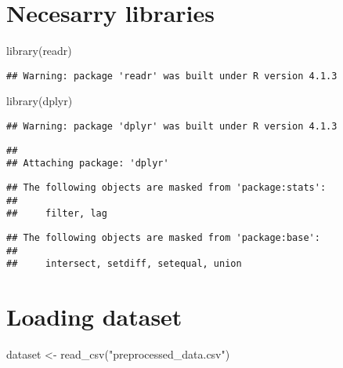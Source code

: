\documentclass[
]{article}
\author{}
\date{\vspace{-2.5em}}
\newenvironment{Shaded}{\begin{snugshade}}{\end{snugshade}}
\newcommand{\FunctionTok}[1]{\textcolor[rgb]{0.00,0.00,0.00}{#1}}
\newcommand{\NormalTok}[1]{#1}
\newcommand{\OtherTok}[1]{\textcolor[rgb]{0.56,0.35,0.01}{#1}}
\newcommand{\StringTok}[1]{\textcolor[rgb]{0.31,0.60,0.02}{#1}}
\begin{document}
\hypertarget{necesarry-libraries}{%
\section{Necesarry libraries}\label{necesarry-libraries}}

\begin{Shaded}
\begin{Highlighting}[]
\FunctionTok{library}\NormalTok{(readr)}
\end{Highlighting}
\end{Shaded}

\begin{verbatim}
## Warning: package 'readr' was built under R version 4.1.3
\end{verbatim}

\begin{Shaded}
\begin{Highlighting}[]
\FunctionTok{library}\NormalTok{(dplyr)}
\end{Highlighting}
\end{Shaded}

\begin{verbatim}
## Warning: package 'dplyr' was built under R version 4.1.3
\end{verbatim}

\begin{verbatim}
## 
## Attaching package: 'dplyr'
\end{verbatim}

\begin{verbatim}
## The following objects are masked from 'package:stats':
## 
##     filter, lag
\end{verbatim}

\begin{verbatim}
## The following objects are masked from 'package:base':
## 
##     intersect, setdiff, setequal, union
\end{verbatim}

\hypertarget{loading-dataset}{%
\section{Loading dataset}\label{loading-dataset}}

\begin{Shaded}
\begin{Highlighting}[]
\NormalTok{dataset }\OtherTok{\textless{}{-}} \FunctionTok{read\_csv}\NormalTok{(}\StringTok{"preprocessed\_data.csv"}\NormalTok{)}
\end{Highlighting}
\end{Shaded}
\end{document}
